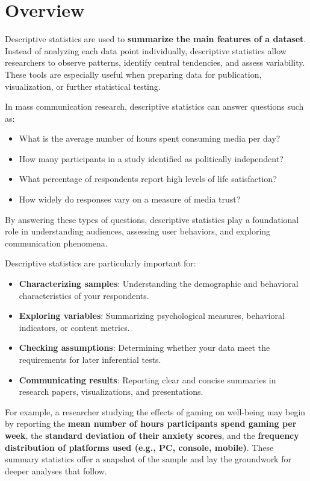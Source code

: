 \documentclass[
]{book}
\providecommand{\tightlist}{%
  \setlength{\itemsep}{0pt}\setlength{\parskip}{0pt}}
\begin{document}
\section{Overview}\label{overview-1}

Descriptive statistics are used to \textbf{summarize the main features of a dataset}. Instead of analyzing each data point individually, descriptive statistics allow researchers to observe patterns, identify central tendencies, and assess variability. These tools are especially useful when preparing data for publication, visualization, or further statistical testing.

In mass communication research, descriptive statistics can answer questions such as:

\begin{itemize}
\tightlist
\item
  What is the average number of hours spent consuming media per day?
\item
  How many participants in a study identified as politically independent?
\item
  What percentage of respondents report high levels of life satisfaction?
\item
  How widely do responses vary on a measure of media trust?
\end{itemize}

By answering these types of questions, descriptive statistics play a foundational role in understanding audiences, assessing user behaviors, and exploring communication phenomena.

Descriptive statistics are particularly important for:

\begin{itemize}
\tightlist
\item
  \textbf{Characterizing samples}: Understanding the demographic and behavioral characteristics of your respondents.
\item
  \textbf{Exploring variables}: Summarizing psychological measures, behavioral indicators, or content metrics.
\item
  \textbf{Checking assumptions}: Determining whether your data meet the requirements for later inferential tests.
\item
  \textbf{Communicating results}: Reporting clear and concise summaries in research papers, visualizations, and presentations.
\end{itemize}

For example, a researcher studying the effects of gaming on well-being may begin by reporting the \textbf{mean number of hours participants spend gaming per week}, the \textbf{standard deviation of their anxiety scores}, and the \textbf{frequency distribution of platforms used (e.g., PC, console, mobile)}. These summary statistics offer a snapshot of the sample and lay the groundwork for deeper analyses that follow.
\end{document}

